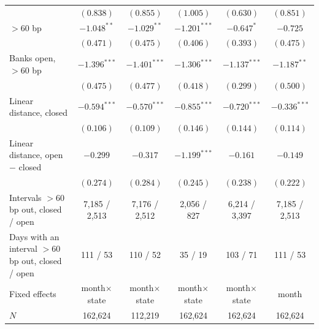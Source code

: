 \begin{tabular}{lccccc}
 & $(0.838)$ & $(0.855)$ & $(1.005)$ & $(0.630)$ & $(0.851)$ \\
\quad $>$60 bp & $-1.048^{**}$ & $-1.029^{**}$ & $-1.201^{***}$ & $-0.647^{*}$ & $-0.725$ \\
 & $(0.471)$ & $(0.475)$ & $(0.406)$ & $(0.393)$ & $(0.475)$ \\
Banks open, $>$60 bp & $-1.396^{***}$ & $-1.401^{***}$ & $-1.306^{***}$ & $-1.137^{***}$ & $-1.187^{**}$ \\
 & $(0.475)$ & $(0.477)$ & $(0.418)$ & $(0.299)$ & $(0.500)$ \\
Linear distance, closed & $-0.594^{***}$ & $-0.570^{***}$ & $-0.855^{***}$ & $-0.720^{***}$ & $-0.336^{***}$ \\
 & $(0.106)$ & $(0.109)$ & $(0.146)$ & $(0.144)$ & $(0.114)$ \\
Linear distance, open $-$ closed & $-0.299$ & $-0.317$ & $-1.199^{***}$ & $-0.161$ & $-0.149$ \\
 & $(0.274)$ & $(0.284)$ & $(0.245)$ & $(0.238)$ & $(0.222)$ \\
\midrule
Intervals $>$60 bp out, closed / open & 7,185 / 2,513 & 7,176 / 2,512 & 2,056 / 827 & 6,214 / 3,397 & 7,185 / 2,513 \\
Days with an interval $>$60 bp out, closed / open & 111 / 53 & 110 / 52 & 35 / 19 & 103 / 71 & 111 / 53 \\
Fixed effects & month$\times$state & month$\times$state & month$\times$state & month$\times$state & month \\
$N$ & 162,624 & 112,219 & 162,624 & 162,624 & 162,624 \\
\bottomrule
\end{tabular}

